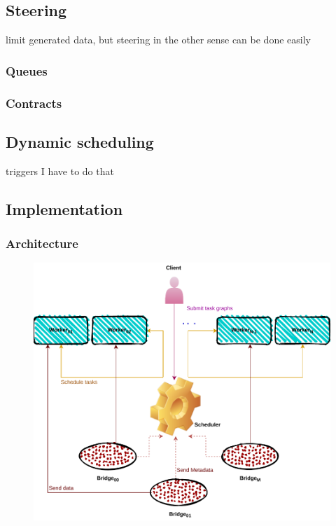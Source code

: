 \subsection{Steering}
limit generated data, but steering in the other sense can be done easily  
\subsubsection{Queues}
\subsubsection{Contracts}
\subsection{Dynamic scheduling}
triggers I have to do that 

\subsection{Implementation}

\cite{deisa}

\subsubsection{Architecture}
\begin{figure}[tb]\centering
\includegraphics{figures/ArchiectureDeisa.pdf}
\caption{\deisa}
\label{figdeida}
\end{figure}

